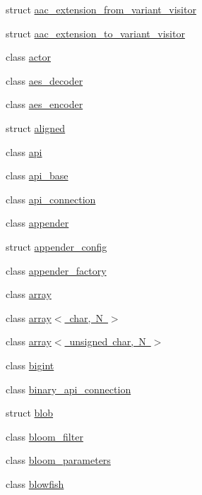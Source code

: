 \begin{DoxyCompactItemize}
\item 
struct \mbox{\hyperlink{structfc_1_1aac__extension__from__variant__visitor}{aac\+\_\+extension\+\_\+from\+\_\+variant\+\_\+visitor}}
\item 
struct \mbox{\hyperlink{structfc_1_1aac__extension__to__variant__visitor}{aac\+\_\+extension\+\_\+to\+\_\+variant\+\_\+visitor}}
\item 
class \mbox{\hyperlink{classfc_1_1actor}{actor}}
\item 
class \mbox{\hyperlink{classfc_1_1aes__decoder}{aes\+\_\+decoder}}
\item 
class \mbox{\hyperlink{classfc_1_1aes__encoder}{aes\+\_\+encoder}}
\item 
struct \mbox{\hyperlink{structfc_1_1aligned}{aligned}}
\item 
class \mbox{\hyperlink{classfc_1_1api}{api}}
\item 
class \mbox{\hyperlink{classfc_1_1api__base}{api\+\_\+base}}
\item 
class \mbox{\hyperlink{classfc_1_1api__connection}{api\+\_\+connection}}
\item 
class \mbox{\hyperlink{classfc_1_1appender}{appender}}
\item 
struct \mbox{\hyperlink{structfc_1_1appender__config}{appender\+\_\+config}}
\item 
class \mbox{\hyperlink{classfc_1_1appender__factory}{appender\+\_\+factory}}
\item 
class \mbox{\hyperlink{classfc_1_1array}{array}}
\item 
class \mbox{\hyperlink{classfc_1_1array_3_01char_00_01_n_01_4}{array$<$ char, N $>$}}
\item 
class \mbox{\hyperlink{classfc_1_1array_3_01unsigned_01char_00_01_n_01_4}{array$<$ unsigned char, N $>$}}
\item 
class \mbox{\hyperlink{classfc_1_1bigint}{bigint}}
\item 
class \mbox{\hyperlink{classfc_1_1binary__api__connection}{binary\+\_\+api\+\_\+connection}}
\item 
struct \mbox{\hyperlink{structfc_1_1blob}{blob}}
\item 
class \mbox{\hyperlink{classfc_1_1bloom__filter}{bloom\+\_\+filter}}
\item 
class \mbox{\hyperlink{classfc_1_1bloom__parameters}{bloom\+\_\+parameters}}
\item 
class \mbox{\hyperlink{classfc_1_1blowfish}{blowfish}}
\item 

\end{DoxyCompactItemize}

